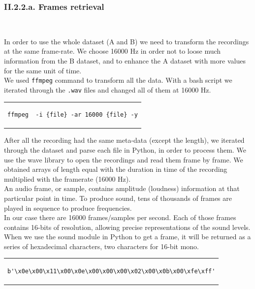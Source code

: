 \documentclass[11pt, a4papper]{report}
\theoremstyle{plain}
\theoremstyle{definition}
\theoremstyle{definition}
\theoremstyle{proposition}
\begin{document}
\subsubsection*{II.2.2.a. Frames retrieval}

\

In order to use the whole dataset (A and B) we need to transform the recordings at the same frame-rate. We choose 16000 Hz in order not to loose much information from the B dataset, and to enhance the A dataset with more values for the same unit of time. 
\\

We used \verb|ffmpeg| command to transform all the data. With a bash script we iterated through the \verb|.wav| files and changed all of them at 16000 Hz. \cite {5}
\begin{center}
\begin{tabular}{c}
\begin{lstlisting}
ffmpeg  -i {file} -ar 16000 {file} -y
\end{lstlisting}
\end{tabular}
\end{center}

After all the recording had the same meta-data (except the length), we iterated through the dataset and parse each file in Python, in order to process them. We use the wave library to open the recordings and read them frame by frame. We obtained arrays of length equal with the duration in time of the recording multiplied with the framerate (16000 Hz).
\\

An audio frame, or sample, contains amplitude (loudness) information at that particular point in time. To produce sound, tens of thousands of frames are played in sequence to produce frequencies.
\\

In our case there are 16000 frames/samples per second. Each of those frames contains 16-bits of resolution, allowing precise representations of the sound levels. When we use the sound module in Python to get a frame, it will be returned as a series of hexadecimal characters, two characters for 16-bit mono.

\begin{center}
\begin{tabular}{c}
\begin{lstlisting}
b'\x0e\x00\x11\x00\x0e\x00\x00\x00\x02\x00\x0b\x00\xfe\xff'
\end{lstlisting}
\end{tabular}
\end{center}
\end{document}
